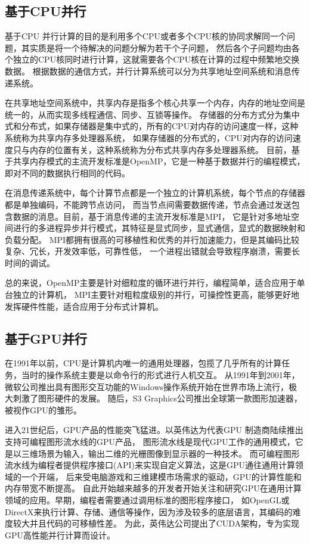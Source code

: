 \documentclass[UTF8]{ctexart}
\begin{document}
        \subsection{基于CPU并行}
        基于CPU 并行计算的目的是利用多个CPU或者多个CPU核的协同求解同一个问题，其实质是将一个待解决的问题分解为若干个子问题，
        然后各个子问题均由各个独立的CPU核同时进行计算，这就需要各个CPU核在计算的过程中频繁地交换数据。
        根据数据的通信方式，并行计算系统可以分为共享地址空间系统和消息传递系统。

        在共享地址空间系统中，共享内存是指多个核心共享一个内存，内存的地址空间是统一的，从而实现多线程通信、同步、互锁等操作。
        存储器的分布方式分为集中式和分布式，如果存储器是集中式的，所有的CPU对内存的访问速度一样，这种系统称为共享内存多处理器系统，
        如果存储器的分布式的，CPU对内存的访问速度只与内存的位置有关，这种系统称为分布式共享内存多处理器系统。
        目前，基于共享内存模式的主流开发标准是OpenMP，它是一种基于数据并行的编程模式，即对不同的数据执行相同的代码。

        在消息传递系统中，每个计算节点都是一个独立的计算机系统，每个节点的存储器都是单独编码，不能跨节点访问，
        而当节点间需要数据传递，节点会通过发送包含数据的消息。目前，基于消息传递的主流开发标准是MPI，
        它是针对多地址空间进行的多进程异步并行模式，其特征是显式同步，显式通信，显式的数据映射和负载分配。
        MPI都拥有很高的可移植性和优秀的并行加速能力，但是其编码比较复杂、冗长，开发效率低，可靠性低，
        一个进程出错就会导致程序崩溃，需要长时间的调试。

        总的来说，OpenMP主要是针对细粒度的循环进行并行，编程简单，适合应用于单台独立的计算机，
        MPI主要针对粗粒度级别的并行，可操控性更高，能够更好地发挥硬件性能，适合应用于分布式计算机。
       
        \subsection{基于GPU并行}
        在1991年以前，CPU是计算机内唯一的通用处理器，包揽了几乎所有的计算任务，当时的操作系统主要是以命令行的形式进行人机交互。
        从1991年到2001年，微软公司推出具有图形交互功能的Windows操作系统开始在世界市场上流行，极大刺激了图形硬件的发展。
        随后，S3 Graphics公司推出全球第一款图形加速器，被视作GPU的雏形。

        进入21世纪后，GPU产品的性能突飞猛进。以英伟达为代表GPU 制造商陆续推出支持可编程图形流水线的GPU产品，
        图形流水线是现代GPU工作的通用模式，它是以三维场景为输入，输出二维的光栅图像到显示器的一种技术。
        而可编程图形流水线为编程者提供程序接口(API)来实现自定义算法，这是GPU通往通用计算领域的一个开端，
        后来受电脑游戏和三维建模市场需求的驱动，GPU的计算性能和内存带宽不断提高。
        自此开始越来越多的开发者开始关注和研究GPU在通用计算领域的应用。早期，编程者需要通过调用标准的图形程序接口，
        如OpenGL或DirectX来执行计算、存储、通信等操作，因为涉及较多的底层语言，其编码的难度较大并且代码的可移植性差。
        为此，英伟达公司提出了CUDA架构，专为实现GPU高性能并行计算而设计。
\end{document}
